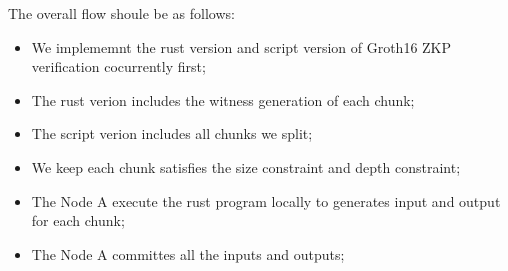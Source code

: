 The overall flow shoule be as follows:
\begin{itemize}
    \item We implememnt the rust version and script version of Groth16 ZKP verification cocurrently first;
    \item The rust verion includes the witness generation of each chunk;
    \item The script verion includes all chunks we split;
    \item We keep each chunk satisfies the size constraint and depth constraint;
    \item The Node A execute the rust program locally to generates input and output for each chunk;
    \item The Node A committes all the inputs and outputs;
\end{itemize}